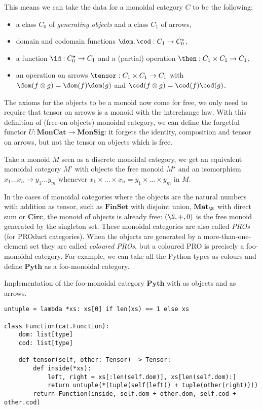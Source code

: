 This means we can take the data for a monoidal category $C$ to be the following:
\begin{itemize}
\item a class $C_0$ of \emph{generating objects} and a class $C_1$ of arrows,
\item domain and codomain functions $\dom, \cod : C_1 \to C_0^\star$,
\item a function $\id : C_0^\star \to C_1$ and a (partial) operation $\then : C_1 \times C_1 \to C_1$,
\item an operation on arrows $\tensor : C_1 \times C_1 \to C_1$ with $\dom (f \otimes g) = \dom(f) \dom(g)$ and $\cod (f \otimes g) = \cod(f) \cod(g)$.
\end{itemize}
The axioms for the objects to be a monoid now come for free, we only need to require that tensor on arrows is a monoid with the interchange law.
With this definition of (free-on-objects) monoidal category, we can define the forgetful functor $U : \mathbf{MonCat} \to \mathbf{MonSig}$: it forgets the identity, composition and tensor on arrows, but not the tensor on objects which is free.

\begin{example}
Take a monoid $M$ seen as a discrete monoidal category, we get an equivalent monoidal category $M'$ with objects the free monoid $M^\star$ and an isomorphism $x_1 \dots x_n \to y_1 \dots y_m$ whenever $x_1 \times \dots \times x_n = y_1 \times \dots \times y_m$ in $M$.
\end{example}

\begin{example}
In the cases of monoidal categories where the objects are the natural numbers with addition as tensor, such as $\mathbf{FinSet}$ with disjoint union, $\mathbf{Mat}_\S$ with direct sum or $\mathbf{Circ}$, the monoid of objects is already free: $(\N, +, 0)$ is the free monoid generated by the singleton set.
These monoidal categories are also called \emph{PROs} (for PROduct categories).
When the objects are generated by a more-than-one-element set they are called \emph{coloured PROs}, but a coloured PRO is precisely a foo-monoidal category.
For example, we can take all the Python types as colours and define $\mathbf{Pyth}$ as a foo-monoidal category.
\end{example}

\begin{python}
{\normalfont Implementation of the foo-monoidal category $\mathbf{Pyth}$ with  as objects and  as arrows.}

\begin{verbatim}
untuple = lambda *xs: xs[0] if len(xs) == 1 else xs

class Function(cat.Function):
    dom: list[type]
    cod: list[type]

    def tensor(self, other: Tensor) -> Tensor:
        def inside(*xs):
            left, right = xs[:len(self.dom)], xs[len(self.dom):]
            return untuple(*(tuple(self(left)) + tuple(other(right))))
        return Function(inside, self.dom + other.dom, self.cod + other.cod)
\end{verbatim}
\end{python}

